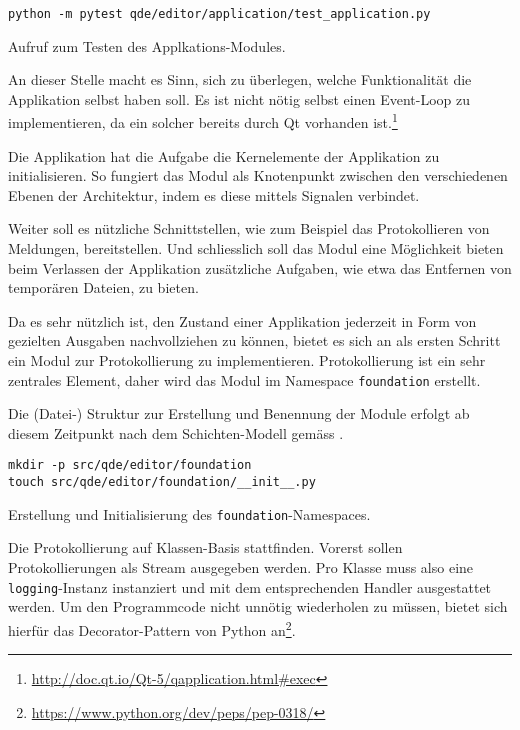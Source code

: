 \documentclass[10pt, openright, notitlepage]{scrreprt}
\begin{document}
\begin{listing}[H]
\begin{verbatim}
python -m pytest qde/editor/application/test_application.py
\end{verbatim}
\caption{Aufruf zum Testen des Applkations-Modules.}
\end{listing}

An dieser Stelle macht es Sinn, sich zu überlegen, welche Funktionalität die
Applikation selbst haben soll. Es ist nicht nötig selbst einen Event-Loop zu
implementieren, da ein solcher bereits durch Qt vorhanden ist.\footnote{\url{http://doc.qt.io/Qt-5/qapplication.html\#exec}}

Die Applikation hat die Aufgabe die Kernelemente der Applikation zu
initialisieren. So fungiert das Modul als Knotenpunkt zwischen den
verschiedenen Ebenen der Architektur, indem es diese mittels Signalen
verbindet.\cite[S. 37 bis 38]{osterwalder_qde_2016}

Weiter soll es nützliche Schnittstellen, wie zum Beispiel das Protokollieren
von Meldungen, bereitstellen. Und schliesslich soll das Modul eine Möglichkeit
bieten beim Verlassen der Applikation zusätzliche Aufgaben, wie etwa das
Entfernen von temporären Dateien, zu bieten.

Da es sehr nützlich ist, den Zustand einer Applikation jederzeit in Form von
gezielten Ausgaben nachvollziehen zu können, bietet es sich an als ersten
Schritt ein Modul zur Protokollierung zu implementieren.
Protokollierung ist ein sehr zentrales Element, daher wird das Modul im
Namespace \texttt{foundation} erstellt.

Die (Datei-) Struktur zur Erstellung und Benennung der Module erfolgt ab diesem
Zeitpunkt nach dem Schichten-Modell gemäss \cite[S. 40]{osterwalder_qde_2016}.

\begin{listing}[H]
\begin{verbatim}
mkdir -p src/qde/editor/foundation
touch src/qde/editor/foundation/__init__.py
\end{verbatim}
\caption{\label{orgb1158ab}
Erstellung und Initialisierung des \texttt{foundation}-Namespaces.}
\end{listing}

Die Protokollierung auf Klassen-Basis stattfinden. Vorerst sollen
Protokollierungen als Stream ausgegeben werden. Pro Klasse muss also eine
\texttt{logging}-Instanz instanziert und mit dem entsprechenden Handler ausgestattet
werden. Um den Programmcode nicht unnötig wiederholen zu müssen, bietet sich
hierfür das Decorator-Pattern von Python an\footnote{\url{https://www.python.org/dev/peps/pep-0318/}}.
\end{document}
